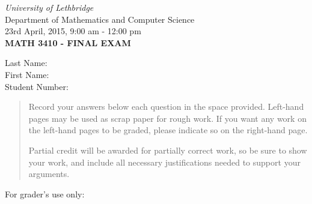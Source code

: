 \documentclass[12pt]{article}
\newcommand{\skipline}{\vspace{12pt}}
\begin{document}
\author{Instructor: Sean Fitzpatrick}
\thispagestyle{plain}
\begin{center}
\emph{University of Lethbridge}\\
Department of Mathematics and Computer Science\\
23rd April, 2015, 9:00 am - 12:00 pm\\
{\bf MATH 3410 - FINAL EXAM}\\
\end{center}
\skipline \skipline \skipline \noindent \skipline
Last Name:\underline{\hspace{350pt}}\\
\skipline
First Name:\underline{\hspace{348pt}}\\
\skipline
Student Number:\underline{\hspace{322pt}}\\
\skipline

\vspace{0.5in}


\begin{quote}

 
 Record your answers below each question in the space provided.    Left-hand pages may be used as scrap paper for rough work.  If you want any work on the left-hand pages to be graded, please indicate so on the right-hand page.
 
 \bigskip
 
Partial credit will be awarded for partially correct work, so be sure to show your work, and include all necessary justifications needed to support your arguments. 


\end{quote}


\vspace{0.25in}

For grader's use only:
\end{document}
